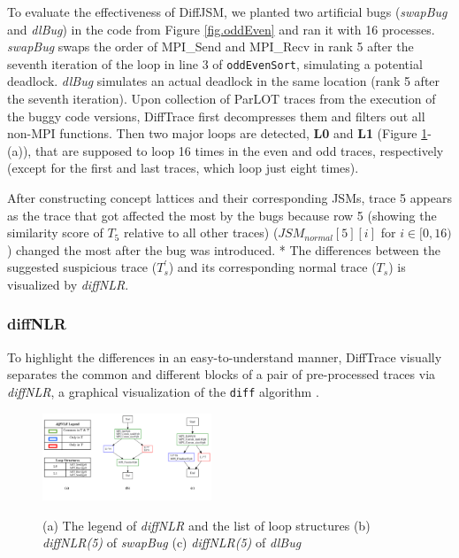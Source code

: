 To evaluate the effectiveness of DiffJSM, we planted two artificial bugs (\textit{swapBug}
and \textit{dlBug}) in the code from Figure \ref{fig.oddEven} and ran it with 16 processes.
%
\textit{swapBug} swaps the order of MPI\_Send and MPI\_Recv in rank 5
after the seventh iteration of the loop in line 3 of \texttt{oddEvenSort},
simulating a potential deadlock. \textit{dlBug} simulates an actual deadlock in the same location
(rank 5 after the seventh iteration).
%
Upon collection of ParLOT traces from the execution of the buggy code versions,
DiffTrace first decompresses them and filters out all non-MPI functions.
Then two major loops are detected, \textbf{L0} and \textbf{L1} (Figure \ref{fig.gdiffs}-(a)),
that are supposed to loop 16 times in the even and odd traces,
respectively (except for the first and last traces, which loop just eight times).

After constructing concept lattices and their corresponding JSMs, trace 5 appears as the trace that got
affected the most by the bugs because row 5 (showing the similarity score of $T_5$ relative to all other traces)
($JSM_{normal}[5][i]$ for $i \in [0,16)$)
  changed the most after the bug was introduced.
*
The differences between the suggested suspicious trace ($T^\prime_s$)
and its corresponding normal trace ($T_s$) is visualized by \textit{diffNLR}.


\subsubsection{diffNLR}
To highlight the differences in an easy-to-understand manner, DiffTrace visually separates the common and different blocks of a pair of pre-processed traces via \textit{diffNLR}, a graphical visualization of the \texttt{diff} algorithm \cite{diff-myers}.
%

\begin{figure}[]
\centering
\caption{(a) The legend of \textit{diffNLR} and the list of loop structures (b) \textit{diffNLR(5)} of \textit{swapBug} (c) \textit{diffNLR(5)} of \textit{dlBug}}
\includegraphics[width=0.45\textwidth]{figs/sampleGdiff.png}
\label{fig.gdiffs}
\end{figure}


